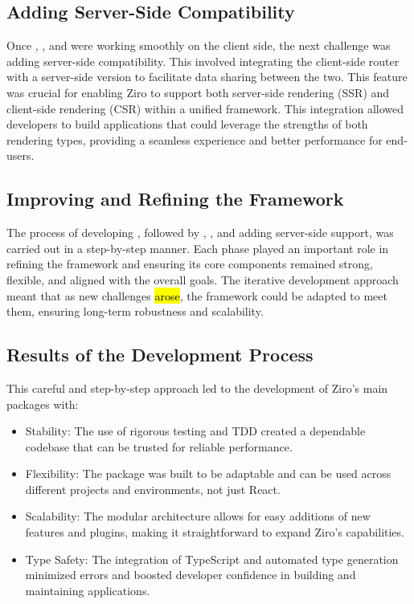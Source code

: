 \subsection{Adding Server-Side Compatibility}
Once , , and  were working smoothly on the client side, the next challenge was adding server-side compatibility. This involved integrating the client-side router with a server-side version to facilitate data sharing between the two. This feature was crucial for enabling Ziro to support both server-side rendering (SSR) and client-side rendering (CSR) within a unified framework. This integration allowed developers to build applications that could leverage the strengths of both rendering types, providing a seamless experience and better performance for end-users.


\subsection{Improving and Refining the Framework}

The process of developing , followed by , , and adding server-side support, was carried out in a step-by-step manner. Each phase played an important role in refining the framework and ensuring its core components remained strong, flexible, and aligned with the overall goals. The iterative development approach meant that as new challenges \hl{arose}, the framework could be adapted to meet them, ensuring long-term robustness and scalability.


\subsection{Results of the Development Process}
This careful and step-by-step approach led to the development of Ziro’s main packages with:
\begin{itemize}
	\item Stability: The use of rigorous testing and TDD created a dependable codebase that can be trusted for reliable performance.

	\item Flexibility: The  package was built to be adaptable and can be used across different projects and environments, not just React.

	\item Scalability: The modular architecture allows for easy additions of new features and plugins, making it straightforward to expand Ziro’s capabilities.

	\item Type Safety: The integration of TypeScript and automated type generation minimized errors and boosted developer confidence in building and maintaining applications.
\end{itemize}

\pagebreak
